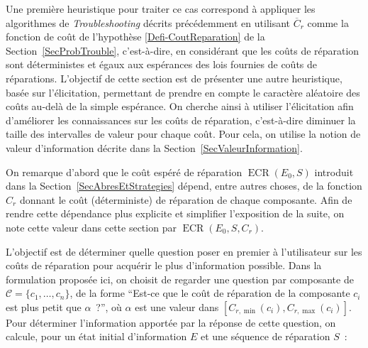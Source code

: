 \documentclass[a4paper,11pt]{article}
\theoremstyle{plain}
\theoremstyle{definition}
\DeclareMathOperator{\ECR}{ECR}
\begin{document}
Une première heuristique pour traiter ce cas correspond à appliquer les algorithmes de \emph{Troubleshooting} décrits précédemment en utilisant $\overline C_r$ comme la fonction de coût de l'hypothèse \ref{Defi-CoutReparation} de la Section~\ref{SecProbTrouble}, c'est-à-dire, en considérant que les coûts de réparation sont déterministes et égaux aux espérances des lois fournies de coûts de réparations. L'objectif de cette section est de présenter une autre heuristique, basée sur l'élicitation, permettant de prendre en compte le caractère aléatoire des coûts au-delà de la simple espérance. On cherche ainsi à utiliser l'élicitation afin d'améliorer les connaissances sur les coûts de réparation, c'est-à-dire diminuer la taille des intervalles de valeur pour chaque coût. Pour cela, on utilise la notion de valeur d'information décrite dans la Section~\ref{SecValeurInformation}.

On remarque d'abord que le coût espéré de réparation $\ECR(E_0, S)$ introduit dans la Section~\ref{SecAbresEtStrategies} dépend, entre autres choses, de la fonction $C_r$ donnant le coût (déterministe) de réparation de chaque composante. Afin de rendre cette dépendance plus explicite et simplifier l'exposition de la suite, on note cette valeur dans cette section par $\ECR(E_0, S, C_r)$.

L'objectif est de déterminer quelle question poser en premier à l'utilisateur sur les coûts de réparation pour acquérir le plus d'information possible. Dans la formulation proposée ici, on choisit de regarder une question par composante de $\mathcal C = \{c_1, \dotsc, c_n\}$, de la forme ``Est-ce que le coût de réparation de la composante $c_i$ est plus petit que $\alpha$~?'', où $\alpha$ est une valeur dans $[C_{r, \min}(c_i), C_{r, \max}(c_i)]$. Pour déterminer l'information apportée par la réponse de cette question, on calcule, pour un état initial d'information $E$ et une séquence de réparation $S$~:

\end{document}
